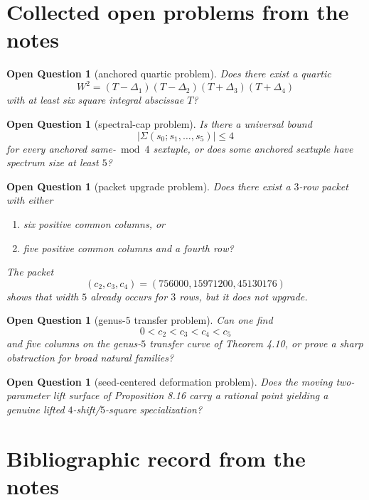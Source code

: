 \documentclass[11pt]{article}
\theoremstyle{plainbreak}
\theoremstyle{defbreak}
\newtheorem{question}[theorem]{Open Question}
\begin{document}
\section{Collected open problems from the notes}

\begin{question}[anchored quartic problem]
Does there exist a quartic
\[
W^2=(T-\Delta_1)(T-\Delta_2)(T+\Delta_3)(T+\Delta_4)
\]
with at least six square integral abscissae $T$?
\end{question}

\begin{question}[spectral-cap problem]
Is there a universal bound
\[
|\Sigma(s_0;s_1,\dots,s_5)|\le 4
\]
for every anchored same-$\bmod 4$ sextuple, or does some anchored sextuple have spectrum size at least $5$?
\end{question}

\begin{question}[packet upgrade problem]
Does there exist a $3$-row packet with either
\begin{enumerate}[label=\textup{(\roman*)}]
    \item six positive common columns, or
    \item five positive common columns and a fourth row?
\end{enumerate}
The packet
\[
(c_2,c_3,c_4)=(756000,15971200,45130176)
\]
shows that width $5$ already occurs for $3$ rows, but it does not upgrade.
\end{question}

\begin{question}[genus-$5$ transfer problem]
Can one find
\[
0<c_2<c_3<c_4<c_5
\]
and five columns on the genus-$5$ transfer curve of Theorem 4.10, or prove a sharp obstruction for broad natural families?
\end{question}

\begin{question}[seed-centered deformation problem]
Does the moving two-parameter lift surface of Proposition 8.16 carry a rational point yielding a genuine lifted $4$-shift/$5$-square specialization?
\end{question}

\appendix

\section{Bibliographic record from the notes}
\end{document}
